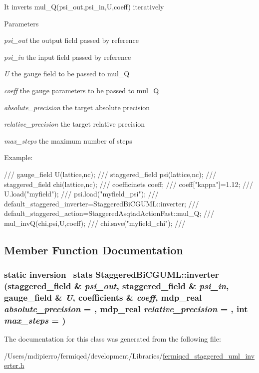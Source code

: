 It inverts mul\_\-Q(psi\_\-out,psi\_\-in,U,coeff) iteratively 
\begin{DoxyParams}{Parameters}
\item[{\em psi\_\-out}]the output field passed by reference \item[{\em psi\_\-in}]the input field passed by reference \item[{\em U}]the gauge field to be passed to mul\_\-Q \item[{\em coeff}]the gauge parameters to be passed to mul\_\-Q \item[{\em absolute\_\-precision}]the target absolute precision \item[{\em relative\_\-precision}]the target relative precision \item[{\em max\_\-steps}]the maximum number of steps\end{DoxyParams}
Example: \begin{DoxyVerb}
/// gauge_field U(lattice,nc);
/// staggered_field psi(lattice,nc);
/// staggered_field chi(lattice,nc);
/// coefficinets coeff;
/// coeff["kappa"]=1.12;
/// U.load("myfield");
/// psi.load("myfield_psi");
/// default_staggered_inverter=StaggeredBiCGUML::inverter;
/// default_staggered_action=StaggeredAsqtadActionFast::mul_Q;
/// mul_invQ(chi,psi,U,coeff);
/// chi.save("myfield_chi");
/// \end{DoxyVerb}
 

\subsection{Member Function Documentation}
\hypertarget{class_staggered_bi_c_g_u_m_l_ac1959ada50857a518ad4c9d82fead805}{
\subsubsection[{inverter}]{\setlength{\rightskip}{0pt plus 5cm}static {\bf inversion\_\-stats} StaggeredBiCGUML::inverter ({\bf staggered\_\-field} \& {\em psi\_\-out}, \/  {\bf staggered\_\-field} \& {\em psi\_\-in}, \/  {\bf gauge\_\-field} \& {\em U}, \/  {\bf coefficients} \& {\em coeff}, \/  {\bf mdp\_\-real} {\em absolute\_\-precision} = {}, \/  {\bf mdp\_\-real} {\em relative\_\-precision} = {}, \/  int {\em max\_\-steps} = {})}}
\label{class_staggered_bi_c_g_u_m_l_ac1959ada50857a518ad4c9d82fead805}


The documentation for this class was generated from the following file:\begin{DoxyCompactItemize}
\item 
/Users/mdipierro/fermiqcd/development/Libraries/\hyperlink{fermiqcd__staggered__uml__inverter_8h}{fermiqcd\_\-staggered\_\-uml\_\-inverter.h}\end{DoxyCompactItemize}
